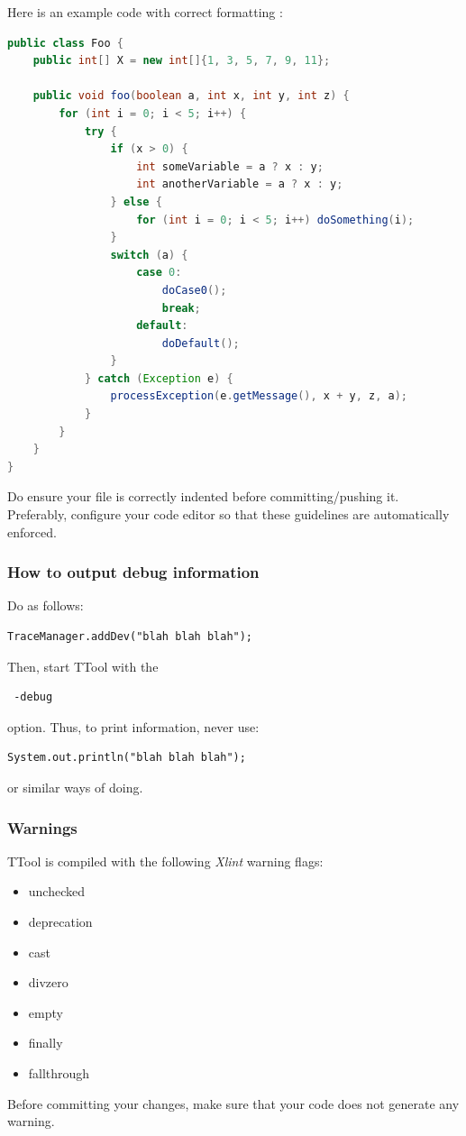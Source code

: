 \documentclass[12pt]{article}
\begin{document}
Here is an example code with correct formatting : \\

\begin{lstlisting}[showspaces=true, language=java, commentstyle=\color{pgreen},
keywordstyle=\color{pblue}, stringstyle=\color{pred}, basicstyle=\ttfamily]
public class Foo {
    public int[] X = new int[]{1, 3, 5, 7, 9, 11};

    public void foo(boolean a, int x, int y, int z) {
        for (int i = 0; i < 5; i++) {
            try {
                if (x > 0) {
                    int someVariable = a ? x : y;
                    int anotherVariable = a ? x : y;
                } else {
                    for (int i = 0; i < 5; i++) doSomething(i);
                }
                switch (a) {
                    case 0:
                        doCase0();
                        break;
                    default:
                        doDefault();
                }
            } catch (Exception e) {
                processException(e.getMessage(), x + y, z, a);
            }
        }
    }
}
\end{lstlisting}

Do ensure your file is correctly indented before committing/pushing it.
Preferably, configure your code editor so that these guidelines are
automatically enforced.


\subsubsection{How to output debug information}
Do as follows:
\begin{lstlisting}
TraceManager.addDev("blah blah blah");
\end{lstlisting}
Then, start TTool with the 
\begin{verbatim}
 -debug
\end{verbatim}
option.
Thus, to print information, never use:
\begin{lstlisting}
System.out.println("blah blah blah");
\end{lstlisting}
or similar ways of doing.

\subsubsection{Warnings}
TTool is compiled with the following \textit{Xlint} warning flags:
\begin{itemize}
    \item unchecked
    \item deprecation
    \item cast
    \item divzero
    \item empty
    \item finally
    \item fallthrough
\end{itemize}
Before committing your changes, make sure that your code does not generate any
warning.
\end{document}
